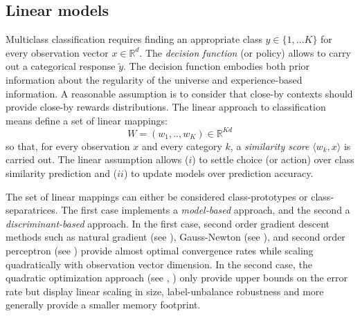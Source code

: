 \documentclass[preprint,12pt,authoryear]{elsarticle}
\begin{document}
\subsection{Linear models}
Multiclass classification requires  finding an appropriate class $y \in \{1,... K\}$ for every observation vector $x \in \mathbb{R}^d$.
The \textit{decision function} (or policy) 
allows to carry out a categorical response $\tilde{y}$. The decision function embodies both prior information about the regularity of the universe and experience-based information. A reasonable assumption  is to consider that  close-by contexts should provide close-by rewards distributions. 
The linear approach to classification means 
define a set of linear mappings:
\begin{equation}\label{eq:W}
W = (w_1,..,w_K) \in \mathbb{R}^{K d}
\end{equation} so that, for every observation $x$ and every category $k$, a \emph{similarity score} $\langle w_k, x\rangle$ is carried out. 
The linear assumption allows ($i$) to 
settle choice (or action) over class similarity prediction and ($ii$) to update models over prediction accuracy.

The set of linear mappings can either be considered class-prototypes or class-separatrices. The first case implements a \textit{model-based} approach, and the second a \textit{discriminant-based} approach. In the first case,  second order gradient descent methods such as natural gradient (see \cite{amari2000adaptive}), Gauss-Newton (see \cite{le2004large}), and second order perceptron (see \cite{cesa2005second}) provide almost optimal convergence rates while scaling quadratically with observation vector dimension.
In the second case, the quadratic optimization approach (see \cite{anlauf1989adatron}, \cite{crammer2006online}) only provide upper bounds on the error rate but display linear scaling in size, label-unbalance robustness and more generally provide a smaller memory footprint. 
\end{document}
